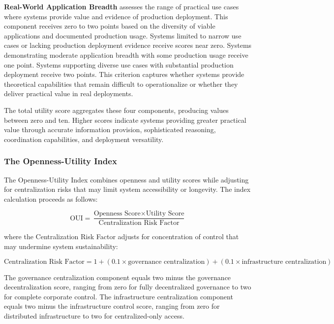 \textbf{Real-World Application Breadth} assesses the range of practical use cases where systems provide value and evidence of production deployment. This component receives zero to two points based on the diversity of viable applications and documented production usage. Systems limited to narrow use cases or lacking production deployment evidence receive scores near zero. Systems demonstrating moderate application breadth with some production usage receive one point. Systems supporting diverse use cases with substantial production deployment receive two points. This criterion captures whether systems provide theoretical capabilities that remain difficult to operationalize or whether they deliver practical value in real deployments.

The total utility score aggregates these four components, producing values between zero and ten. Higher scores indicate systems providing greater practical value through accurate information provision, sophisticated reasoning, coordination capabilities, and deployment versatility.

\subsubsection{The Openness-Utility Index}

The Openness-Utility Index combines openness and utility scores while adjusting for centralization risks that may limit system accessibility or longevity. The index calculation proceeds as follows:

\begin{equation}
\text{OUI} = \frac{\text{Openness Score} \times \text{Utility Score}}{\text{Centralization Risk Factor}}
\end{equation}

where the Centralization Risk Factor adjusts for concentration of control that may undermine system sustainability:

\begin{equation}
\text{Centralization Risk Factor} = 1 + (0.1 \times \text{governance centralization}) + (0.1 \times \text{infrastructure centralization})
\end{equation}

The governance centralization component equals two minus the governance decentralization score, ranging from zero for fully decentralized governance to two for complete corporate control. The infrastructure centralization component equals two minus the infrastructure control score, ranging from zero for distributed infrastructure to two for centralized-only access.

